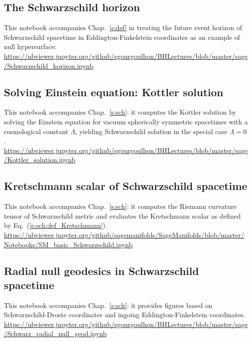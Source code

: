 \subsection{The Schwarzschild horizon} \label{s:sam:Schwarz_hor}

This notebook accompanies Chap.~\ref{s:def} in treating the future event horizon of
Schwarzschild spacetime in Eddington-Finkelstein coordinates as an example of null hypersurface:\\[1ex]
{\footnotesize
\url{https://nbviewer.jupyter.org/github/egourgoulhon/BHLectures/blob/master/sage/Schwarzschild_horizon.ipynb}
}


\subsection{Solving Einstein equation: Kottler solution} \label{s:sam:Kottler_solution}

This notebook accompanies Chap.~\ref{s:sch}: it computes the Kottler solution by solving the Einstein
equation for vacuum spherically symmetric spacetimes with a cosmological constant $\Lambda$,
yielding Schwarzschild solution in the special case $\Lambda=0$. \\[1ex]
{\footnotesize
\url{https://nbviewer.jupyter.org/github/egourgoulhon/BHLectures/blob/master/sage/Kottler_solution.ipynb}
}

\subsection{Kretschmann scalar of Schwarzschild spacetime} \label{s:sam:Kretschmann_Schwarz}

This notebook accompanies Chap.~\ref{s:sch}: it computes the Riemann curvature
tensor of Schwarzschild metric and evaluates the Kretschmann scalar as defined
by Eq.~(\ref{e:sch:def_Kretschmann}). \\[1ex]
{\footnotesize
\url{https://nbviewer.jupyter.org/github/sagemanifolds/SageManifolds/blob/master/Notebooks/SM_basic_Schwarzschild.ipynb}
}

\subsection{Radial null geodesics in Schwarzschild spacetime}

This notebook accompanies Chap.~\ref{s:sch}: it provides figures based on
Schwarzschild-Droste coordinates and ingoing Eddington-Finkelstein coordinates.\\[1ex]
{\footnotesize
\url{https://nbviewer.jupyter.org/github/egourgoulhon/BHLectures/blob/master/sage/Schwarz_radial_null_geod.ipynb}
}

